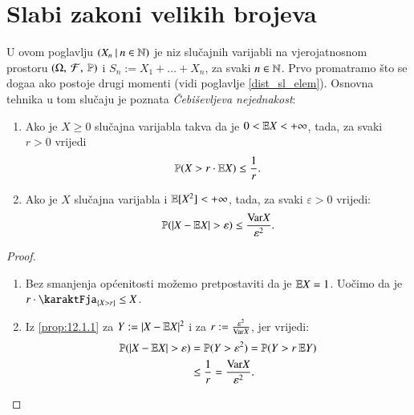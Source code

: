 
\chapter{Slabi zakoni velikih brojeva}

U ovom poglavlju $({X_n} \: | \: {n \in \mathbb{N}})$ je niz slu\v cajnih varijabli na vjerojatnosnom prostoru $(\Omega, \: \mathcal{F}, \: \mathbb{P})$ i $S_n := X_1 + \ldots + X_n$, za svaki $n \in \mathbb{N}$.
Prvo promatramo \v sto se doga\dj a ako postoje drugi momenti (vidi poglavlje \ref{dist_sl_elem}).
Osnovna tehnika u tom slu\v caju je poznata \emph{\v Cebi\v sevljeva nejednakost}:

\begin{prop}    \label{prop:12.1}
    \quad
    \begin{enumerate}[label=(\roman*)]
        \item   \label{prop:12.1.1}
        Ako je $X \geq 0$ slu\v cajna varijabla takva da je $0 < \mathbb{E} X < +\infty$, tada, za svaki $r > 0$ vrijedi
        \begin{equation*}
            \mathbb{P}({X > r \cdot \mathbb{E} X}) \leq \frac{1}{r}.
        \end{equation*}
        \item   \label{prop:12.1.2}
        Ako je $X$ slu\v cajna varijabla i $\mathbb{E} [X^2] < +\infty$, tada, za svaki $\varepsilon > 0$ vrijedi:
        \begin{equation*}
            \mathbb{P}({|X - \mathbb{E} X| > \varepsilon}) \leq \frac{\mathrm{Var} X}{\varepsilon^2}.
        \end{equation*}
    \end{enumerate}
\end{prop}

\begin{proof}
    \quad
    \begin{enumerate}[label=(\roman*)]
        \item Bez smanjenja op\' cenitosti mo\v zemo pretpostaviti da je $\mathbb{E} X = 1$.
        Uo\v cimo da je $r \cdot \karaktFja_{\{X > r\}} \leq X$.
        \item Iz \ref{prop:12.1.1} za $Y:= |X - \mathbb{E} X|^2$ i za $r:= \frac{\varepsilon^2}{\mathrm{Var} X}$, jer vrijedi:
        \begin{equation*}
            \begin{aligned}
                \mathbb{P}({|X - \mathbb{E} X| > \varepsilon}) &= \mathbb{P}({Y > \varepsilon^2}) = \mathbb{P}({Y > r \: \mathbb{E} Y})\\
                & \leq \frac{1}{r} = \frac{\mathrm{Var} X}{\varepsilon^2}.
            \end{aligned}
        \end{equation*}
    \end{enumerate}
\end{proof}


